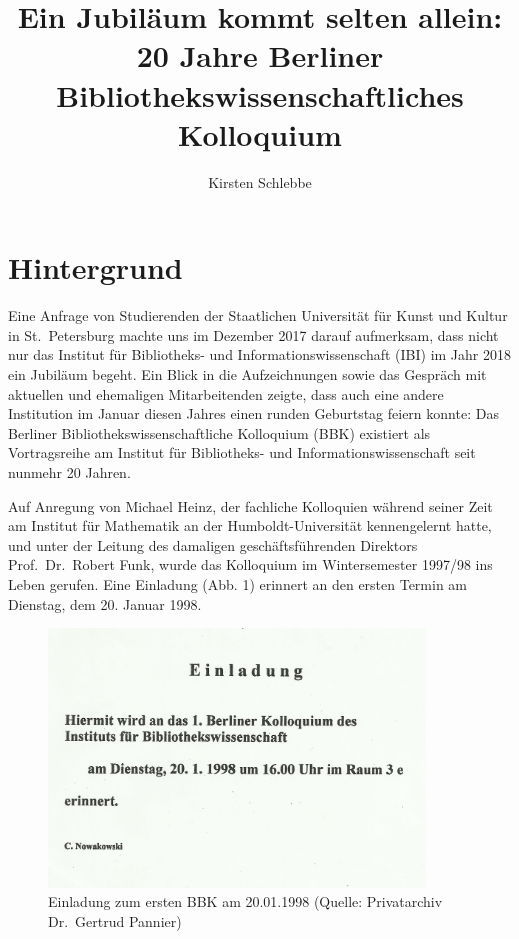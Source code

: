 \documentclass[a4paper,
fontsize=11pt,
oneside,
numbers=noperiodatend,
parskip=half-,
bibliography=totoc,
final
]{scrartcl}
\title{\LARGE{Ein Jubiläum kommt selten allein: 20 Jahre Berliner Bibliothekswissenschaftliches Kolloquium}}%
\author{Kirsten Schlebbe} %
\date{}
\begin{document}
\maketitle
\thispagestyle{fancyplain} 


\hypertarget{hintergrund}{%
\section{Hintergrund}\label{hintergrund}}

Eine Anfrage von Studierenden der Staatlichen Universität für Kunst und
Kultur in St.~Petersburg machte uns im Dezember 2017 darauf aufmerksam,
dass nicht nur das Institut für Bibliotheks- und
Informationswissenschaft (IBI) im Jahr 2018 ein Jubiläum begeht. Ein
Blick in die Aufzeichnungen sowie das Gespräch mit aktuellen und
ehemaligen Mitarbeitenden zeigte, dass auch eine andere Institution im
Januar diesen Jahres einen runden Geburtstag feiern konnte: Das Berliner
Bibliothekswissenschaftliche Kolloquium (BBK) existiert als
Vortragsreihe am Institut für Bibliotheks- und Informationswissenschaft
seit nunmehr 20 Jahren.

Auf Anregung von Michael Heinz, der fachliche Kolloquien während seiner
Zeit am Institut für Mathematik an der Humboldt-Universität
kennengelernt hatte, und unter der Leitung des damaligen
geschäftsführenden Direktors Prof.~Dr.~Robert Funk, wurde das Kolloquium
im Wintersemester 1997/98 ins Leben gerufen. Eine Einladung (Abb. 1)
erinnert an den ersten Termin am Dienstag, dem 20. Januar 1998.

\begin{figure}
\centering
\includegraphics[width=10cm]{img/Abbildung1.jpg}
\caption{Einladung zum ersten BBK am 20.01.1998 (Quelle: Privatarchiv
Dr.~Gertrud Pannier)}
\end{figure}
\end{document}
